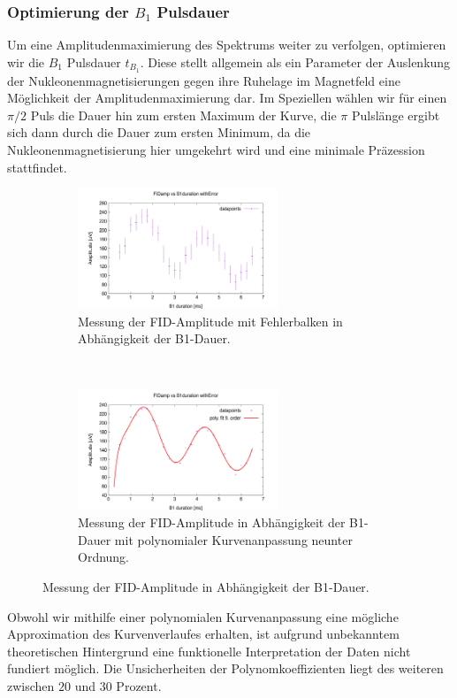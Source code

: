 \documentclass[../../main.tex]{subfiles}
\begin{document}
        \subsubsection*{Optimierung der $B_1$ Pulsdauer}\label{subsubsec:5:B1PulsdauerOptimierung}
            Um eine Amplitudenmaximierung des Spektrums weiter zu verfolgen, optimieren wir die $B_1$ Pulsdauer $t_{B_1}$. Diese stellt allgemein als ein Parameter der Auslenkung der Nukleonenmagnetisierungen gegen ihre Ruhelage im Magnetfeld eine Möglichkeit der Amplitudenmaximierung dar. Im Speziellen wählen wir für einen $\pi/2$ Puls die Dauer hin zum ersten Maximum der Kurve, die $\pi$ Pulslänge ergibt sich dann durch die Dauer zum ersten Minimum, da die Nukleonenmagnetisierung hier umgekehrt wird und eine minimale Präzession stattfindet. 
            \begin{figure}[H]
                \centering
                \begin{subfigure}[t]{0.45\textwidth}
                    \centering
                    \includegraphics[width=6cm]{Bilddateien/5/B1DurationFast_FIDamp_vs_B1duration_withError.png}
                    \caption{Messung der FID-Amplitude mit Fehlerbalken in Abhängigkeit der B1-Dauer.}
                    \label{fig:5:FastFIDampVsB1durationWithError}
                \end{subfigure}
                \
                \begin{subfigure}[t]{0.45\textwidth}
                    \centering
                    \includegraphics[width=6cm]{Bilddateien/5/B1DurationFast_FIDamp_vs_B1duration_withError_poly.png}
                    \caption{Messung der FID-Amplitude in Abhängigkeit der B1-Dauer mit polynomialer Kurvenanpassung neunter Ordnung.}
                    \label{fig:5:FastFIDampVsB1duration}
                \end{subfigure}
                \caption{Messung der FID-Amplitude in Abhängigkeit der B1-Dauer.}
            \end{figure}
            Obwohl wir mithilfe einer polynomialen Kurvenanpassung eine mögliche Approximation des Kurvenverlaufes erhalten, ist aufgrund unbekanntem theoretischen Hintergrund eine funktionelle Interpretation der Daten nicht fundiert möglich. Die Unsicherheiten der Polynomkoeffizienten liegt des weiteren zwischen $20$ und $30$ Prozent. \\
\end{document}
